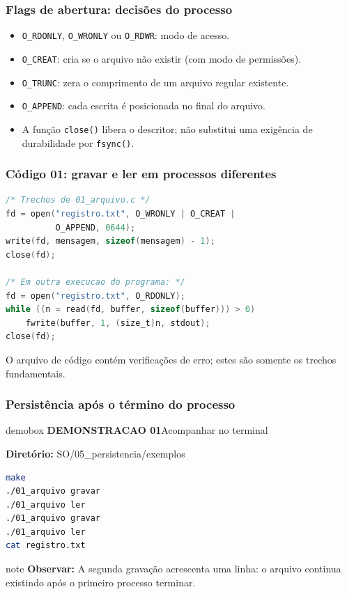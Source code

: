 \documentclass[aspectratio=169,11pt]{beamer}
\begin{document}
\begin{frame}
\frametitle{Flags de abertura: decisões do processo}
\large
\begin{itemize}
\item \texttt{O\_RDONLY}, \texttt{O\_WRONLY} ou \texttt{O\_RDWR}: modo de acesso.
\item \texttt{O\_CREAT}: cria se o arquivo não existir (com modo de permissões).
\item \texttt{O\_TRUNC}: zera o comprimento de um arquivo regular existente.
\item \texttt{O\_APPEND}: cada escrita é posicionada no final do arquivo.
\item A função \texttt{close()} libera o descritor; não substitui uma exigência de durabilidade por \texttt{fsync()}.
\end{itemize}

\end{frame}

\begin{frame}[fragile]
\frametitle{Código 01: gravar e ler em processos diferentes}
\begin{lstlisting}[language=C]
/* Trechos de 01_arquivo.c */
fd = open("registro.txt", O_WRONLY | O_CREAT |
          O_APPEND, 0644);
write(fd, mensagem, sizeof(mensagem) - 1);
close(fd);

/* Em outra execucao do programa: */
fd = open("registro.txt", O_RDONLY);
while ((n = read(fd, buffer, sizeof(buffer))) > 0)
    fwrite(buffer, 1, (size_t)n, stdout);
close(fd);
\end{lstlisting}
\vfill\small\textcolor{dkblue}{O arquivo de código contém verificações de erro; estes são somente os trechos fundamentais.}

\end{frame}

\begin{frame}[fragile]
\frametitle{Persistência após o término do processo}
\begin{beamercolorbox}[wd=\textwidth,sep=3mm,rounded=true]{demobox}
{\large\bfseries DEMONSTRACAO 01}\hfill{\normalsize Acompanhar no terminal}
\end{beamercolorbox}
\vspace{2mm}
\textbf{Diretório:} {\ttfamily\small SO/05\_persistencia/exemplos}
\vspace{1mm}
\begin{lstlisting}[language=bash]
make
./01_arquivo gravar
./01_arquivo ler
./01_arquivo gravar
./01_arquivo ler
cat registro.txt
\end{lstlisting}
\begin{beamercolorbox}[wd=\textwidth,sep=2mm,rounded=true]{note}
\small\textbf{Observar:} A segunda gravação acrescenta uma linha: o arquivo continua existindo após o primeiro processo terminar.
\end{beamercolorbox}
\end{frame}
\end{document}
